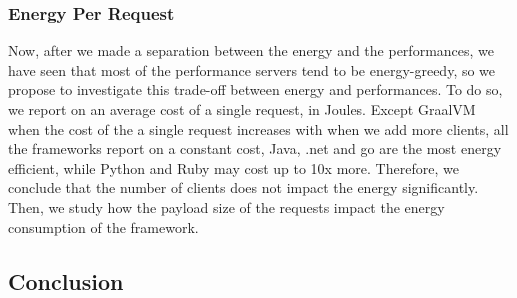 \subsubsection{Energy Per Request}
Now, after we made a separation between the energy and the performances, we have seen that most of the performance servers tend to be energy-greedy, so we propose to investigate this trade-off between energy and performances.
To do so, we report on an average cost of a single request, in Joules.
Except GraalVM when the cost of the a single request increases with when we add more clients, all the frameworks report on a constant cost, Java, .net and go are the most energy efficient, while Python and Ruby may cost up to 10x more.
Therefore, we conclude that the number of clients does not impact the energy significantly.
Then, we study how the payload size of the requests impact the energy consumption of the framework.




\subsection{Conclusion }
